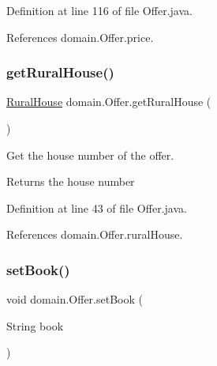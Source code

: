 Definition at line 116 of file Offer.\+java.


\begin{DoxyCode}{0}

\end{DoxyCode}


References domain.\+Offer.\+price.

\mbox{\label{classdomain_1_1Offer_a3804f5f9ad3a3bf380e55389ccfa9dba}} 
\subsubsection{\texorpdfstring{getRuralHouse()}{getRuralHouse()}}
{\footnotesize\ttfamily \mbox{\hyperlink{classdomain_1_1RuralHouse}{Rural\+House}} domain.\+Offer.\+get\+Rural\+House (\begin{DoxyParamCaption}{ }\end{DoxyParamCaption})}



Get the house number of the offer. 

\begin{DoxyReturn}{Returns}
the house number 
\end{DoxyReturn}


Definition at line 43 of file Offer.\+java.


\begin{DoxyCode}{0}

\end{DoxyCode}


References domain.\+Offer.\+rural\+House.

\mbox{\label{classdomain_1_1Offer_a35ebc81c0ebfe427d7bb68abaf811852}} 
\subsubsection{\texorpdfstring{setBook()}{setBook()}}
{\footnotesize\ttfamily void domain.\+Offer.\+set\+Book (\begin{DoxyParamCaption}\item[{String}]{book }\end{DoxyParamCaption})}



